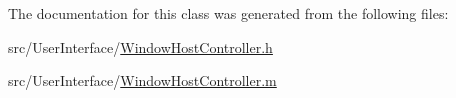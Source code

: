 The documentation for this class was generated from the following files\-:\begin{DoxyCompactItemize}
\item 
src/\-User\-Interface/\hyperlink{_window_host_controller_8h}{Window\-Host\-Controller.\-h}\item 
src/\-User\-Interface/\hyperlink{_window_host_controller_8m}{Window\-Host\-Controller.\-m}\end{DoxyCompactItemize}
